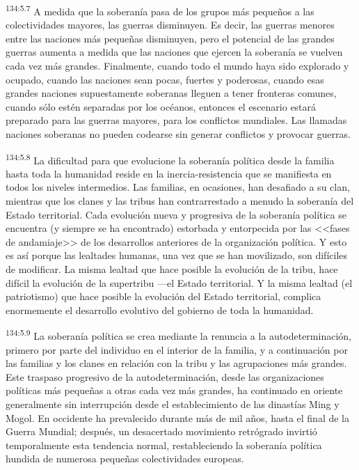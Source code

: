 \par 
\textsuperscript{134:5.7} A medida que la soberanía pasa de los grupos más pequeños a las colectividades mayores, las guerras disminuyen. Es decir, las guerras menores entre las naciones más pequeñas disminuyen, pero el potencial de las grandes guerras aumenta a medida que las naciones que ejercen la soberanía se vuelven cada vez más grandes. Finalmente, cuando todo el mundo haya sido explorado y ocupado, cuando las naciones sean pocas, fuertes y poderosas, cuando esas grandes naciones supuestamente soberanas lleguen a tener fronteras comunes, cuando sólo estén separadas por los océanos, entonces el escenario estará preparado para las guerras mayores, para los conflictos mundiales. Las llamadas naciones soberanas no pueden codearse sin generar conflictos y provocar guerras.

\par 
\textsuperscript{134:5.8} La dificultad para que evolucione la soberanía política desde la familia hasta toda la humanidad reside en la inercia-resistencia que se manifiesta en todos los niveles intermedios. Las familias, en ocasiones, han desafiado a su clan, mientras que los clanes y las tribus han contrarrestado a menudo la soberanía del Estado territorial. Cada evolución nueva y progresiva de la soberanía política se encuentra (y siempre se ha encontrado) estorbada y entorpecida por las <<fases de andamiaje>> de los desarrollos anteriores de la organización política. Y esto es así porque las lealtades humanas, una vez que se han movilizado, son difíciles de modificar. La misma lealtad que hace posible la evolución de la tribu, hace difícil la evolución de la supertribu ---el Estado territorial. Y la misma lealtad (el patriotismo) que hace posible la evolución del Estado territorial, complica enormemente el desarrollo evolutivo del gobierno de toda la humanidad.

\par 
\textsuperscript{134:5.9} La soberanía política se crea mediante la renuncia a la autodeterminación, primero por parte del individuo en el interior de la familia, y a continuación por las familias y los clanes en relación con la tribu y las agrupaciones más grandes. Este traspaso progresivo de la autodeterminación, desde las organizaciones políticas más pequeñas a otras cada vez más grandes, ha continuado en oriente generalmente sin interrupción desde el establecimiento de las dinastías Ming y Mogol. En occidente ha prevalecido durante más de mil años, hasta el final de la Guerra Mundial; después, un desacertado movimiento retrógrado invirtió temporalmente esta tendencia normal, restableciendo la soberanía política hundida de numerosa pequeñas colectividades europeas.

